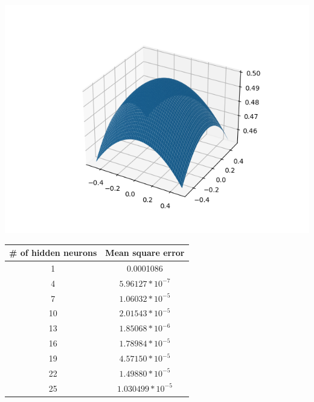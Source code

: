 \documentclass[a4paper]{article}
\begin{document}
\begin{minipage}{0.5\textwidth}
    \centering
    \includegraphics[width=\linewidth]{Labs/Lab 1/Lab 1b/Figure/Figure_1.png}
    \label{fig:gauss-function}
\end{minipage}%
\hfill%
\begin{minipage}{0.45\textwidth}
    \centering
    \begin{tabular}{|c|c|}
        \hline
        \# of hidden neurons & Mean square error \\
        \hline
        1 & 0.0001086\\
        \hline 
        4 & $5.96127*10^{-7}$\\
        \hline
        7 & $1.06032*10^{-5}$\\
        \hline
        10 & $2.01543*10^{-5}$\\
        \hline
        13 & $1.85068*10^{-6}$\\
        \hline
        16 & $1.78984*10^{-5}$\\
        \hline
        19 & $4.57150*10^{-5}$\\
        \hline
        22 & $1.49880*10^{-5}$\\
        \hline
        25 & $1.030499*10^{-5}$\\
        \hline
    \end{tabular}
    \label{table:mse}
\end{minipage}
\end{document}

